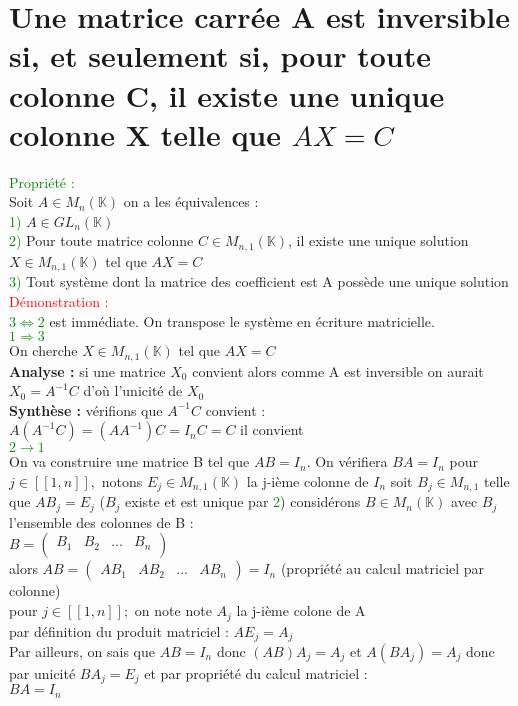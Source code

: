 \documentclass{article}
\begin{document}
	\section{Une matrice carrée A est inversible si, et seulement si, pour toute colonne C, il existe une unique colonne X telle que $AX=C$}
	\textcolor{green}{Propriété :} \\
	Soit $A \in M_n(\mathbb K)$ on a les équivalences : \\
	\textcolor{green}{1)} $A \in GL_n(\mathbb K)$ \\
	\textcolor{green}{2)} Pour toute matrice colonne $C \in M_{n,1}(\mathbb K)$, il existe une unique solution $X \in M_{n,1}(\mathbb K)$ tel que $AX=C$ \\
	\textcolor{green}{3)} Tout système dont la matrice des coefficient est A possède une unique solution \\
	\textcolor{red}{Démonstration :} \\
	\textcolor{green}{$3 \Leftrightarrow 2$ } est immédiate. On transpose le système en écriture matricielle. \\
	\textcolor{green}{$1 \Rightarrow 3$} \\
	On cherche $X \in M_{n,1}(\mathbb K)$ tel que  $AX=C$ \\
	{\bf Analyse :} si une matrice $X_0$ convient alors comme A est inversible on aurait $X_0=A^{-1}C$ d'où l'unicité de $X_0$ \\
	{\bf Synthèse :} vérifions que $A^{-1}C$ convient : \\
	$A(A^{-1}C)= (A A^{-1})C=I_n C =C$ il convient \\
	\textcolor{green}{ $2 \rightarrow 1$} \\
	On va construire une matrice B tel que $AB=I_n$. On vérifiera $BA=I_n$ pour $j \in [[1,n]],$ notons $E_j \in M_{n,1}(\mathbb K)$ la j-ième colonne de $I_n$ soit $B_j \in M_{n,1}$ telle que
	$AB_j=E_j$ ($B_j$ existe et est unique par \textcolor{green}{2}) considérons $B \in M_n(\mathbb K)$ avec $B_j$ l'ensemble des colonnes de B : \\
	$B= \begin{pmatrix}
B_1 & B_2 & ... & B_n \\
	\end{pmatrix}$ \\
	alors $AB= \begin{pmatrix}
	AB_1 & AB_2 & ... & AB_n\end{pmatrix}=I_n$ (propriété au calcul matriciel par colonne) \\
	pour $j \in [[1,n]] ;$ on note note $A_j$ la j-ième colone de A \\
	par définition du produit matriciel : $AE_j=A_j$ \\
	Par ailleurs, on sais que $AB=I_n$ donc $(AB)A_j=A_j$ et $A(BA_j)=A_j$
	donc par unicité $BA_j=E_j$ et par propriété du calcul matriciel : \\ $BA=I_n$
\end{document}
